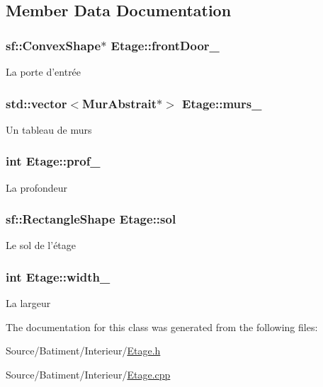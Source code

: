 \subsection{Member Data Documentation}
\hypertarget{classEtage_a66b0fb3c8567a835d0f65585a3ca7ec3}{
\subsubsection[{front\-Door\-\_\-}]{\setlength{\rightskip}{0pt plus 5cm}sf\-::\-Convex\-Shape$\ast$ Etage\-::front\-Door\-\_\-\hspace{0.3cm}{\ttfamily [private]}}}\label{classEtage_a66b0fb3c8567a835d0f65585a3ca7ec3}
La porte d'entrée \hypertarget{classEtage_a2e8c120a9956af256550bea2d0b4e1ec}{
\subsubsection[{murs\-\_\-}]{\setlength{\rightskip}{0pt plus 5cm}std\-::vector$<${\bf Mur\-Abstrait}$\ast$$>$ Etage\-::murs\-\_\-\hspace{0.3cm}{\ttfamily [private]}}}\label{classEtage_a2e8c120a9956af256550bea2d0b4e1ec}
Un tableau de murs \hypertarget{classEtage_aede3188a63f55b1d17d9b2bf6a256976}{
\subsubsection[{prof\-\_\-}]{\setlength{\rightskip}{0pt plus 5cm}int Etage\-::prof\-\_\-\hspace{0.3cm}{\ttfamily [private]}}}\label{classEtage_aede3188a63f55b1d17d9b2bf6a256976}
La profondeur \hypertarget{classEtage_abf98991bae9845f98d70ef6801108b6a}{
\subsubsection[{sol}]{\setlength{\rightskip}{0pt plus 5cm}sf\-::\-Rectangle\-Shape Etage\-::sol\hspace{0.3cm}{\ttfamily [private]}}}\label{classEtage_abf98991bae9845f98d70ef6801108b6a}
Le sol de l'étage \hypertarget{classEtage_a5f820189aca5b74a16442b7262bb6ad5}{
\subsubsection[{width\-\_\-}]{\setlength{\rightskip}{0pt plus 5cm}int Etage\-::width\-\_\-\hspace{0.3cm}{\ttfamily [private]}}}\label{classEtage_a5f820189aca5b74a16442b7262bb6ad5}
La largeur 

The documentation for this class was generated from the following files\-:\begin{DoxyCompactItemize}
\item 
Source/\-Batiment/\-Interieur/\hyperlink{Etage_8h}{Etage.\-h}\item 
Source/\-Batiment/\-Interieur/\hyperlink{Batiment_2Interieur_2Etage_8cpp}{Etage.\-cpp}\end{DoxyCompactItemize}
